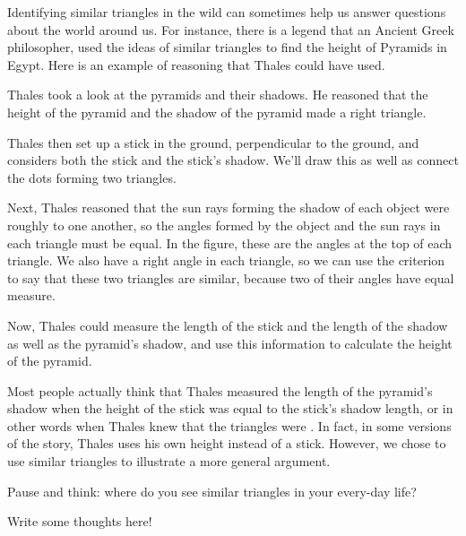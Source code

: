 \documentclass{ximera}
\begin{document}
Identifying similar triangles in the wild can sometimes help us answer questions about the world around us. For instance, there is a legend that an Ancient Greek philosopher,  used the ideas of similar triangles to find the height of Pyramids in Egypt. Here is an example of reasoning that Thales could have used.
\begin{example}
Thales took a look at the pyramids and their shadows. He reasoned that the height of the pyramid and the shadow of the pyramid made a right triangle.
\begin{center}
\end{center}
Thales then set up a stick in the ground, perpendicular to the ground, and considers both the stick and the stick's shadow. We'll draw this as well as connect the dots forming two triangles.
\begin{center}
\end{center}
Next, Thales reasoned that the sun rays forming the shadow of each object were roughly  to one another, so the angles formed by the object and the sun rays in each triangle must be equal. In the figure, these are the angles at the top of each triangle. We also have a right angle in each triangle, so we can use the  criterion to say that these two triangles are similar, because two of their angles have equal measure.

Now, Thales could measure the length of the stick and the length of the shadow as well as the pyramid's shadow, and use this information to calculate the height of the pyramid.

\end{example}
Most people actually think that Thales measured the length of the pyramid's shadow when the height of the stick was equal to the stick's shadow length, or in other words when Thales knew that the triangles were . In fact, in some versions of the story, Thales uses his own height instead of a stick. However, we chose to use similar triangles to illustrate a more general argument.

\begin{question}
Pause and think: where do you see similar triangles in your every-day life?
\begin{freeResponse}
Write some thoughts here!
\end{freeResponse}
\end{question}
\end{document}
